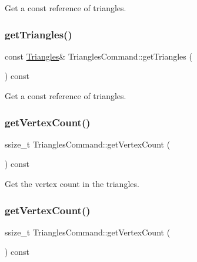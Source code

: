 Get a const reference of triangles. \mbox{\label{classTrianglesCommand_a6800ca337954a12e6ad0cf1f08ec0ec9}} 
\subsubsection{\texorpdfstring{get\+Triangles()}{getTriangles()}\hspace{0.1cm}{\footnotesize\ttfamily [2/2]}}
{\footnotesize\ttfamily const \hyperlink{structTrianglesCommand_1_1Triangles}{Triangles}\& Triangles\+Command\+::get\+Triangles (\begin{DoxyParamCaption}{ }\end{DoxyParamCaption}) const\hspace{0.3cm}{\ttfamily [inline]}}

Get a const reference of triangles. \mbox{\label{classTrianglesCommand_aca1f762574af533898e639cfb480e2c5}} 
\subsubsection{\texorpdfstring{get\+Vertex\+Count()}{getVertexCount()}\hspace{0.1cm}{\footnotesize\ttfamily [1/2]}}
{\footnotesize\ttfamily ssize\+\_\+t Triangles\+Command\+::get\+Vertex\+Count (\begin{DoxyParamCaption}{ }\end{DoxyParamCaption}) const\hspace{0.3cm}{\ttfamily [inline]}}

Get the vertex count in the triangles. \mbox{\label{classTrianglesCommand_aca1f762574af533898e639cfb480e2c5}} 
\subsubsection{\texorpdfstring{get\+Vertex\+Count()}{getVertexCount()}\hspace{0.1cm}{\footnotesize\ttfamily [2/2]}}
{\footnotesize\ttfamily ssize\+\_\+t Triangles\+Command\+::get\+Vertex\+Count (\begin{DoxyParamCaption}{ }\end{DoxyParamCaption}) const\hspace{0.3cm}{\ttfamily [inline]}}


